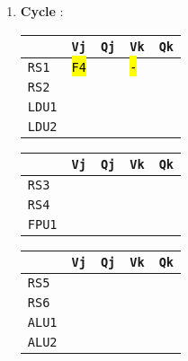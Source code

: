 \begin{enumerate}
    \item \textbf{Cycle \theenumi}:
    
    \begin{minipage}{0.45\textwidth}
        \centering
        \begin{tabular}{@{} l | l l l l @{}}
            \toprule
                & \texttt{Vj} & \texttt{Qj} & \texttt{Vk} & \texttt{Qk} \\
            \midrule
            \texttt{RS1} & \hl{\texttt{F4}} & & \hl{\texttt{-}} & \\ [.3em]
            \texttt{RS2} & & & & \\ [.3em]
            \cmidrule{1-5}
            \texttt{LDU1} & & & & \\ [.3em]
            \texttt{LDU2} & & & & \\
            \bottomrule
        \end{tabular}
    \end{minipage}
    \hfill
    \begin{minipage}{0.45\textwidth}
        \centering
        \begin{tabular}{@{} l | l l l l @{}}
            \toprule
            & \texttt{Vj} & \texttt{Qj} & \texttt{Vk} & \texttt{Qk} \\
            \midrule
            \texttt{RS3} & & & & \\ [.3em]
            \texttt{RS4} & & & & \\ [.3em]
            \cmidrule{1-5}
            \texttt{FPU1} & & & & \\
            \bottomrule
        \end{tabular}
    \end{minipage}

    \begin{center}
        \begin{tabular}{@{} l | l l l l @{}}
            \toprule
            & \texttt{Vj} & \texttt{Qj} & \texttt{Vk} & \texttt{Qk} \\
            \midrule
            \texttt{RS5} & & & & \\ [.3em]
            \texttt{RS6} & & & & \\ [.3em]
            \cmidrule{1-5}
            \texttt{ALU1} & & & & \\ [.3em]
            \texttt{ALU2} & & & & \\
            \bottomrule
        \end{tabular}
    \end{center}
    \newpage
    



\end{enumerate}
